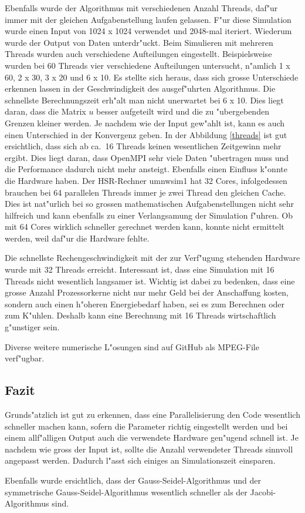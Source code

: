 \begin{refsection}
Ebenfalls wurde der Algorithmus mit verschiedenen Anzahl
Threads, daf"ur immer mit der gleichen Aufgabenstellung laufen
gelassen. F"ur diese Simulation wurde einen Input von 1024 x 1024
verwendet und 2048-mal iteriert. Wiederum wurde der Output von
Daten unterdr"uckt. Beim Simulieren mit mehreren Threads wurden auch
verschiedene Aufteilungen eingestellt. Beispielsweise wurden bei 60
Threads vier verschiedene Aufteilungen untersucht, n"amlich 1 x 60,
2 x 30, 3 x 20 und 6 x 10. Es stellte sich heraus, dass sich grosse
Unterschiede erkennen lassen in der Geschwindigkeit des ausgef"uhrten
Algorithmus. Die schnellste Berechnungszeit erh"alt man nicht unerwartet
bei 6 x 10. Dies liegt daran, dass die Matrix $u$ besser aufgeteilt
wird und die zu "ubergebenden Grenzen kleiner werden. Je nachdem wie
der Input gew"ahlt ist, kann es auch einen Unterschied in der Konvergenz
geben. In der Abbildung \ref{threads} ist gut ersichtlich, dass sich ab
ca.~16 Threads keinen wesentlichen Zeitgewinn mehr ergibt. Dies liegt
daran, dass OpenMPI sehr viele Daten "ubertragen muss und die Performance
dadurch nicht mehr ansteigt. Ebenfalls einen Einfluss k"onnte die Hardware
haben. Der HSR-Rechner umnwsim1 hat 32 Cores, infolgedessen brauchen
bei 64 parallelen Threads immer je zwei Thread den gleichen Cache. Dies
ist nat"urlich bei so grossen mathematischen Aufgabenstellungen nicht
sehr hilfreich und kann ebenfalls zu einer Verlangsamung der Simulation
f"uhren. Ob mit 64 Cores wirklich schneller gerechnet werden kann,
konnte nicht ermittelt werden, weil daf"ur die Hardware fehlte.

Die schnellste Rechengeschwindigkeit mit der zur Verf"ugung
stehenden Hardware wurde mit 32 Threads erreicht. Interessant ist, dass
eine Simulation mit 16 Threads nicht wesentlich langsamer ist. Wichtig
ist dabei zu bedenken, dass eine grosse Anzahl Prozessorkerne nicht
nur mehr Geld bei der Anschaffung kosten, sondern auch einen h"oheren
Energiebedarf haben, sei es zum Berechnen oder zum K"uhlen. Deshalb kann
eine Berechnung mit 16 Threads wirtschaftlich g"unstiger sein. 

Diverse weitere numerische L"osungen sind auf GitHub als
MPEG-File verf"ugbar.
	
\subsection{Fazit}
Grunds"atzlich ist gut zu erkennen, dass eine Parallelisierung den Code
wesentlich schneller machen kann, sofern die Parameter richtig eingestellt
werden und bei einem allf"alligen Output auch die verwendete Hardware
gen"ugend schnell ist. Je nachdem wie gross der Input ist, sollte die
Anzahl verwendeter Threads sinnvoll angepasst werden. Dadurch l"asst
sich einiges an Simulationszeit einsparen. 
	
Ebenfalls wurde ersichtlich, dass der Gauss-Seidel-Algorithmus
und der symmetrische Gauss-Seidel-Algorithmus wesentlich schneller als
der Jacobi-Algorithmus sind.
	
	
\end{refsection}
